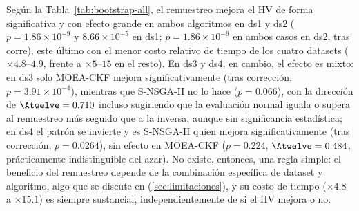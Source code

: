 Según la Tabla~\ref{tab:bootstrap-all}, el remuestreo mejora el HV de forma significativa y con efecto grande en ambos algoritmos en ds1 y ds2 ($p=1.86\times10^{-9}$ y $8.66\times10^{-5}$ en ds1; $p=1.86\times10^{-9}$ en ambos casos en ds2, tras corre), este último con el menor costo relativo de tiempo de los cuatro datasets ($\times4.8$--$4.9$, frente a $\times5$--$15$ en el resto). En ds3 y ds4, en cambio, el efecto es mixto: en ds3 solo MOEA-CKF mejora significativamente (tras corrección, $p=3.91\times10^{-4}$), mientras que S-NSGA-II no lo hace ($p=0.066$), con la dirección de $\Atwelve=0.710$ incluso sugiriendo que la evaluación normal iguala o supera al remuestreo más seguido que a la inversa, aunque sin significancia estadística; en ds4 el patrón se invierte y es S-NSGA-II quien mejora significativamente (tras corrección, $p=0.0264$), sin efecto en MOEA-CKF ($p=0.224$, $\Atwelve=0.484$, prácticamente indistinguible del azar). No existe, entonces, una regla simple: el beneficio del remuestreo depende de la combinación específica de dataset y algoritmo, algo que se discute en (\ref{sec:limitaciones}), y su costo de tiempo ($\times4.8$ a $\times15.1$) es siempre sustancial, independientemente de si el HV mejora o no.

